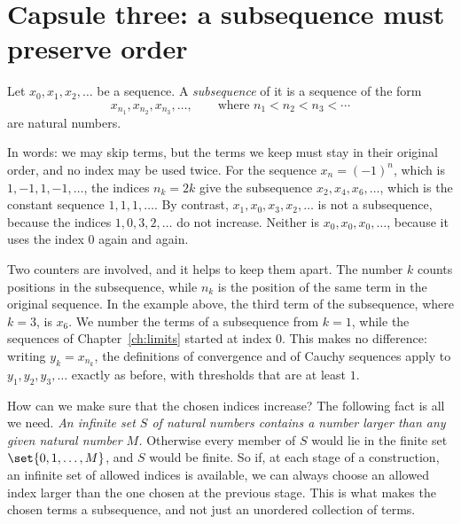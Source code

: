 \section{Capsule three: a subsequence must preserve order}\label{ch17:sec:subsequence}
\par\noindent\begin{minipage}{\linewidth}
\begin{definition}[Subsequence]\label{ch17:def:subsequence}
Let $x_0,x_1,x_2,\ldots$ be a sequence. A \emph{subsequence} of it is a sequence of the form
\[
 x_{n_1},x_{n_2},x_{n_3},\ldots,
 \qquad\text{where }n_1<n_2<n_3<\cdots
\]
are natural numbers.
\end{definition}
\end{minipage}\par

In words: we may skip terms, but the terms we keep must stay in their original order, and no index may be used twice. For the sequence $x_n=(-1)^n$, which is $1,-1,1,-1,\ldots$, the indices $n_k=2k$ give the subsequence $x_2,x_4,x_6,\ldots$, which is the constant sequence $1,1,1,\ldots$. By contrast, $x_1,x_0,x_3,x_2,\ldots$ is not a subsequence, because the indices $1,0,3,2,\ldots$ do not increase. Neither is $x_0,x_0,x_0,\ldots$, because it uses the index $0$ again and again.

Two counters are involved, and it helps to keep them apart. The number $k$ counts positions in the subsequence, while $n_k$ is the position of the same term in the original sequence. In the example above, the third term of the subsequence, where $k=3$, is $x_6$. We number the terms of a subsequence from $k=1$, while the sequences of Chapter~\ref{ch:limits} started at index $0$. This makes no difference: writing $y_k=x_{n_k}$, the definitions of convergence and of Cauchy sequences apply to $y_1,y_2,y_3,\ldots$ exactly as before, with thresholds that are at least $1$.

How can we make sure that the chosen indices increase? The following fact is all we need. \emph{An infinite set $S$ of natural numbers contains a number larger than any given natural number $M$.} Otherwise every member of $S$ would lie in the finite set $\set{0,1,\ldots,M}$, and $S$ would be finite. So if, at each stage of a construction, an infinite set of allowed indices is available, we can always choose an allowed index larger than the one chosen at the previous stage. This is what makes the chosen terms a subsequence, and not just an unordered collection of terms.

